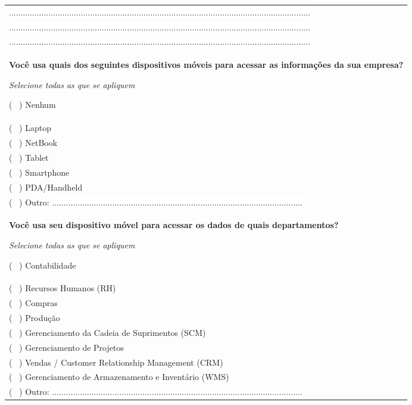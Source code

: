\begin{longtable}{|p{15.7cm}|}
	\colorbox{white}{ .................................................................................................................................. } \\
	\colorbox{white}{ .................................................................................................................................. } \\
	\colorbox{white}{ .................................................................................................................................. } \\
	\begin{Spacing}{0.8} \end{Spacing}
	\begin{Spacing}{0.8} 
		\textbf{Você usa  quais dos seguintes dispositivos móveis para acessar as informações da sua empresa?} \end{Spacing} 
	\begin{Spacing}{2.0} 
		\tiny \textit{Selecione todas as que se apliquem} \end{Spacing} 
	( \ ) Nenhum  \\
	( \ ) Laptop  \\
	( \ ) NetBook  \\
	( \ ) Tablet  \\
	( \ ) Smartphone  \\
	( \ ) PDA/Handheld \\
	( \ ) Outro: \colorbox{white}{ ............................................................................................................ } \\
	\begin{Spacing}{0.8} \end{Spacing}
	\begin{Spacing}{0.8} 
		\textbf{Você usa seu dispositivo móvel para acessar os dados de quais departamentos?} \end{Spacing} 
	\begin{Spacing}{2.0} 
		\tiny \textit{Selecione todas as que se apliquem} \end{Spacing} 
	( \ ) Contabilidade \\
	( \ ) Recursos Humanos (RH) \\
	( \ ) Compras \\
	( \ ) Produção \\
	( \ ) Gerenciamento da Cadeia de Suprimentos (SCM) \\
	( \ ) Gerenciamento de Projetos  \\
	( \ ) Vendas / Customer Relationship Management (CRM) \\
	( \ ) Gerenciamento de Armazenamento e Inventário (WMS) \\
	( \ ) Outro: \colorbox{white}{ ............................................................................................................ } \\
	\hline
\end{longtable}

